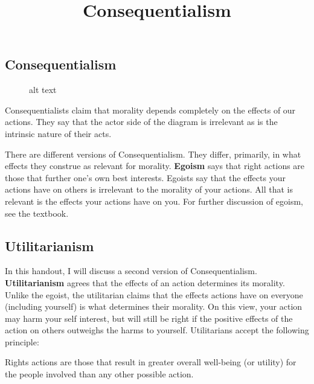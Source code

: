 \documentclass[]{article}
\title{Consequentialism}
\date{}
\begin{document}
\maketitle

\subsection{Consequentialism}\label{consequentialism}

\begin{figure}[htbp]
\centering
\caption{alt text}
\end{figure}

Consequentialists claim that morality depends completely on the effects
of our actions. They say that the actor side of the diagram is
irrelevant as is the intrinsic nature of their acts.

There are different versions of Consequentialism. They differ,
primarily, in what effects they construe as relevant for morality.
\textbf{Egoism} says that right actions are those that further one's own
best interests. Egoists say that the effects your actions have on others
is irrelevant to the morality of your actions. All that is relevant is
the effects your actions have on you. For further discussion of egoism,
see the textbook.

\subsection{Utilitarianism}\label{utilitarianism}

In this handout, I will discuss a second version of Consequentialism.
\textbf{Utilitarianism} agrees that the effects of an action determines
its morality. Unlike the egoist, the utilitarian claims that the effects
actions have on everyone (including yourself) is what determines their
morality. On this view, your action may harm your self interest, but
will still be right if the positive effects of the action on others
outweighs the harms to yourself. Utilitarians accept the following
principle:

\begin{description}
\itemsep1pt\parskip0pt
\item[The Principle of Utility]
Rights actions are those that result in greater overall well-being (or
utility) for the people involved than any other possible action.
\end{description}
\end{document}
